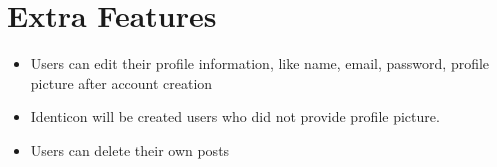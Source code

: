 \documentclass{homework}
\begin{document}
\section{Extra Features}
\begin{itemize}
    \item Users can edit their profile information, like name, email, password, profile picture after account creation 
    \item Identicon will be created users who did not provide profile picture. 
    \item Users can delete their own posts
\end{itemize}
\end{document}
